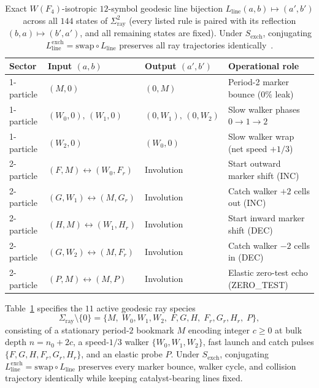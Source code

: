 \begin{table}[tb]
\centering
\caption{Exact $W(F_4)$-isotropic $12$-symbol geodesic line bijection $L_{\mathrm{line}}(a, b) \mapsto (a', b')$ across all $144$ states of $\Sigma_{\mathrm{ray}}^2$ (every listed rule is paired with its reflection $(b,a) \mapsto (b',a')$, and all remaining states are fixed). Under $S_{\mathrm{exch}}$, conjugating $L_{\mathrm{line}}^{\mathrm{exch}} = \mathrm{swap} \circ L_{\mathrm{line}}$ preserves all ray trajectories identically~\cite{pollard2026repo}.}
\label{tab:lrev-table}
\footnotesize
\setlength{\tabcolsep}{4pt}
\begin{tabular}{@{}llll@{}}
\toprule
Sector & Input $(a, b)$ & Output $(a', b')$ & Operational role \\
\midrule
1-particle & $(M, 0)$ & $(0, M)$ & Period-2 marker bounce ($0\%$ leak) \\
1-particle & $(W_0, 0),\,(W_1, 0)$ & $(0, W_1),\,(0, W_2)$ & Slow walker phases $0 \to 1 \to 2$ \\
1-particle & $(W_2, 0)$ & $(W_0, 0)$ & Slow walker wrap (net speed $+1/3$) \\
2-particle & $(F, M) \leftrightarrow (W_0, F_r)$ & Involution & Start outward marker shift (INC) \\
2-particle & $(G, W_1) \leftrightarrow (M, G_r)$ & Involution & Catch walker $+2$ cells out (INC) \\
2-particle & $(H, M) \leftrightarrow (W_1, H_r)$ & Involution & Start inward marker shift (DEC) \\
2-particle & $(G, W_2) \leftrightarrow (M, F_r)$ & Involution & Catch walker $-2$ cells in (DEC) \\
2-particle & $(P, M) \leftrightarrow (M, P)$ & Involution & Elastic zero-test echo (ZERO\_TEST) \\
\bottomrule
\end{tabular}
\end{table}

Table~\ref{tab:lrev-table} specifies the $11$ active geodesic ray species
\begin{equation}
\label{eq:species-list}
\Sigma_{\mathrm{ray}} \setminus \{0\} = \{M,\; W_0, W_1, W_2,\; F, G, H,\; F_r, G_r, H_r,\; P\},
\end{equation}
consisting of a stationary period-$2$ bookmark $M$ encoding integer $c \ge 0$ at bulk depth $n = n_0 + 2c$, a speed-$1/3$ walker $\{W_0, W_1, W_2\}$, fast launch and catch pulses $\{F,G,H,F_r,G_r,H_r\}$, and an elastic probe $P$. Under $S_{\mathrm{exch}}$, conjugating $L_{\mathrm{line}}^{\mathrm{exch}} = \mathrm{swap} \circ L_{\mathrm{line}}$ preserves every marker bounce, walker cycle, and collision trajectory identically while keeping catalyst-bearing lines fixed.

